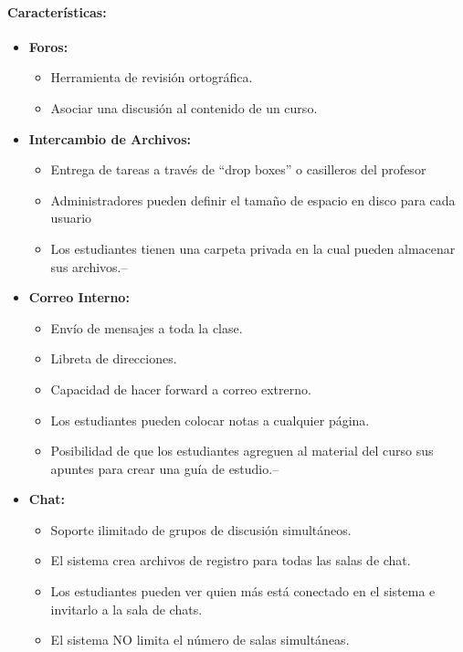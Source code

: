 	\paragraph{Características:}
	\begin{itemize}
		\item \textbf{Foros:}
			\begin{itemize}
				\item Herramienta de revisión ortográfica.
				\item Asociar una discusión al contenido de un curso.
			\end{itemize}
	\end{itemize}
	\begin{itemize}
		\item \textbf{Intercambio de Archivos:}
			\begin{itemize}
				\item Entrega de tareas a través de ``drop boxes'' o casilleros del profesor
				\item Administradores pueden definir el tamaño de espacio en disco para cada usuario
				\item Los estudiantes tienen una carpeta privada en la cual pueden almacenar sus archivos.--
			\end{itemize}
	\end{itemize}
	\begin{itemize}
		\item \textbf{Correo Interno:}
			\begin{itemize}
				\item Envío de mensajes a toda la clase.
				\item Libreta de direcciones.
				\item Capacidad de hacer forward a correo extrerno.
				\item Los estudiantes pueden colocar notas a cualquier página.
				\item Posibilidad de que los estudiantes agreguen al material del curso sus apuntes para crear una guía de estudio.--
			\end{itemize}
	\end{itemize}
	\begin{itemize}
		\item \textbf{Chat:}
			\begin{itemize}
				\item Soporte ilimitado de grupos de discusión simultáneos.
				\item El sistema crea archivos de registro para todas las salas de chat.
				\item Los estudiantes pueden ver quien más está conectado en el sistema e invitarlo a la sala de chats.
				\item El sistema NO limita el número de salas simultáneas.
			\end{itemize}
	\end{itemize}
